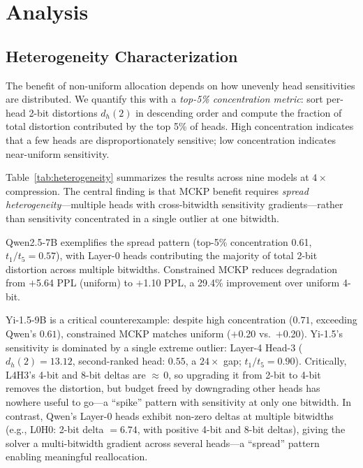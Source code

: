 \section{Analysis}
\label{sec:analysis}

\subsection{Heterogeneity Characterization}
\label{sec:heterogeneity}

The benefit of non-uniform allocation depends on how unevenly head sensitivities are distributed.
We quantify this with a \emph{top-5\% concentration metric}: sort per-head 2-bit distortions $d_h(2)$ in descending order and compute the fraction of total distortion contributed by the top 5\% of heads.
High concentration indicates that a few heads are disproportionately sensitive; low concentration indicates near-uniform sensitivity.

Table~\ref{tab:heterogeneity} summarizes the results across nine models at $4\times$ compression.
The central finding is that MCKP benefit requires \emph{spread heterogeneity}---multiple heads with cross-bitwidth sensitivity gradients---rather than sensitivity concentrated in a single outlier at one bitwidth.

Qwen2.5-7B exemplifies the spread pattern (top-5\% concentration 0.61, $t_1/t_5{=}0.57$), with Layer-0 heads contributing the majority of total 2-bit distortion across multiple bitwidths.
Constrained MCKP reduces degradation from $+$5.64 PPL (uniform) to $+$1.10 PPL, a 29.4\% improvement over uniform 4-bit. %

Yi-1.5-9B is a critical counterexample: despite high concentration ($0.71$, exceeding Qwen's $0.61$), constrained MCKP matches uniform ($+$0.20 vs.\ $+$0.20). %
Yi-1.5's sensitivity is dominated by a single extreme outlier: Layer-4 Head-3 ($d_h(2){=}13.12$, second-ranked head: $0.55$, a $24\times$ gap; $t_1/t_5{=}0.90$). %
Critically, L4H3's 4-bit and 8-bit deltas are ${\approx}\,0$, so upgrading it from 2-bit to 4-bit removes the distortion, but budget freed by downgrading other heads has nowhere useful to go---a ``spike'' pattern with sensitivity at only one bitwidth.
In contrast, Qwen's Layer-0 heads exhibit non-zero deltas at multiple bitwidths (e.g., L0H0: 2-bit delta ${=}6.74$, with positive 4-bit and 8-bit deltas), giving the solver a multi-bitwidth gradient across several heads---a ``spread'' pattern enabling meaningful reallocation. %

